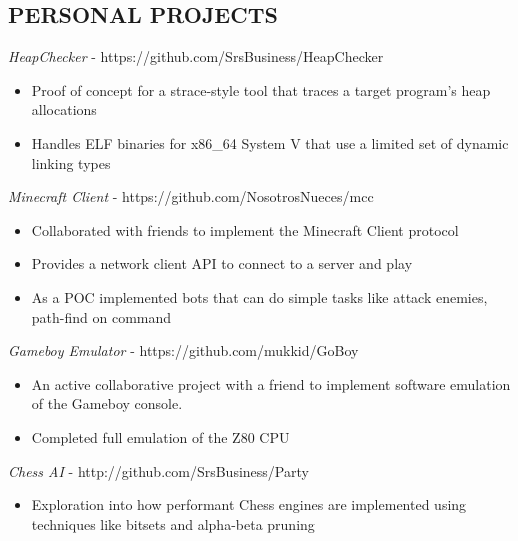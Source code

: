 \documentclass[overlapped, 10pt]{res} %
\begin{document}
\begin{resume}

\section{PERSONAL PROJECTS}
{\sl HeapChecker} - https://github.com/SrsBusiness/HeapChecker
\begin{itemize} \itemsep -2pt %
    \item Proof of concept for a strace-style tool that traces a target program's heap allocations
    \item Handles ELF binaries for x86\_64 System V that use a limited set of dynamic linking types
\end{itemize}
{\sl Minecraft Client} - https://github.com/NosotrosNueces/mcc
\begin{itemize} \itemsep -2pt %
    \item Collaborated with friends to implement the Minecraft Client protocol
    \item Provides a network client API to connect to a server and play
    \item As a POC implemented bots that can do simple tasks like attack enemies, path-find on command
\end{itemize}
{\sl Gameboy Emulator} - https://github.com/mukkid/GoBoy
\begin{itemize} \itemsep -2pt %
    \item An active collaborative project with a friend to implement software emulation of the Gameboy console.
    \item Completed full emulation of the Z80 CPU
\end{itemize}
{\sl Chess AI} - http://github.com/SrsBusiness/Party
\begin{itemize} \itemsep -2pt %
    \item Exploration into how performant Chess engines are implemented using techniques like bitsets and alpha-beta pruning
\end{itemize}

\end{resume}
\end{document}
